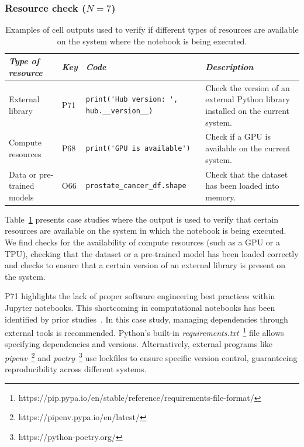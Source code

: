 \subsubsection{Resource check ($N = 7$)}

\begin{table}
\centering
\caption{Examples of cell outputs used to verify if different types of resources are available on the system where the notebook is being executed.}
\begin{tabular}{@{}m{} m{} m{} m{}@{}}
\toprule
\emph{\textbf{Type of resource}}&
\emph{\textbf{Key}}&
\emph{\textbf{Code}}&
\emph{\textbf{Description}}\\
\midrule

External library&
P71&
\begin{lstlisting}
print('Hub version: ', hub.__version__)
\end{lstlisting}&
Check the version of an external Python library installed on the current system.\\

Compute resources&
P68&
\begin{lstlisting}
print('GPU is available')
\end{lstlisting}&
Check if a GPU is available on the current system.\\

Data or pre-trained models&
O66&
\begin{lstlisting}
prostate_cancer_df.shape
\end{lstlisting}&
Check that the dataset has been loaded into memory.\\
\bottomrule
\end{tabular}
\label{tab:resource-check}
\end{table}

Table~\ref{tab:resource-check} presents case studies where the output is used to verify that certain resources are available on the system in which the notebook is being executed. We find checks for the availability of compute resources (such as a GPU or a TPU), checking that the dataset or a pre-trained model has been loaded correctly and checks to ensure that a certain version of an external library is present on the system.

P71 highlights the lack of proper software engineering best practices within Jupyter notebooks. This shortcoming in computational notebooks has been identified by prior studies~\cite{quaranta2021kgtorrent, pimentel2019large-scale}. In this case study, managing dependencies through external tools is recommended. Python's built-in \emph{requirements.txt}~\footnote{https://pip.pypa.io/en/stable/reference/requirements-file-format/} file allows specifying dependencies and versions. Alternatively, external programs like \emph{pipenv}~\footnote{https://pipenv.pypa.io/en/latest/} and \emph{poetry}~\footnote{https://python-poetry.org/} use lockfiles to ensure specific version control, guaranteeing reproducibility across different systems. 

